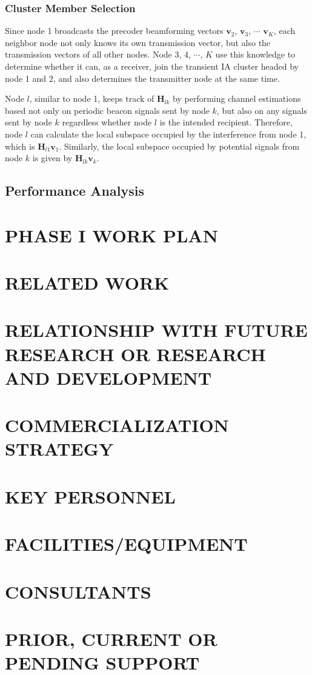 \documentclass[letterpaper,11pt]{article}
\begin{document}
\subsubsection{Cluster Member Selection}
 
Since node 1 broadcasts the precoder beamforming vectors  $\boldsymbol{v}_2$, $\boldsymbol{v}_3$, $\cdots$ $\boldsymbol{v}_K$, each neighbor node not only knows its own transmission vector, but also the transmission vectors of all other nodes. Node 3, 4, $\cdots$, $K$ use this knowledge to determine whether it can, as a receiver, join the transient IA cluster headed by node 1 and 2, and also determines the transmitter node at the same time. 

Node $l$, similar to node 1, keeps track of $\boldsymbol{H}_{lk}$ by performing channel estimations based not only on periodic beacon signals sent by node $k$, but also on any signals sent by node $k$ regardless whether node $l$ is the intended recipient. Therefore, node $l$ can calculate the local subspace occupied by the interference from node 1, which is $\boldsymbol{H}_{l1}\boldsymbol{v}_{1}$.  Similarly, the local subspace occupied by potential signals from node $k$ is given by $\boldsymbol{H}_{lk}\boldsymbol{v}_{k}$.
 
 

\subsection{Performance Analysis}


\section{PHASE I WORK PLAN}

\section{RELATED WORK}

\section{RELATIONSHIP WITH FUTURE RESEARCH OR RESEARCH AND DEVELOPMENT}

\section{COMMERCIALIZATION STRATEGY}

\section{KEY PERSONNEL}

\section{FACILITIES/EQUIPMENT}

\section{CONSULTANTS}

\section{PRIOR, CURRENT OR PENDING SUPPORT}



\end{document}
